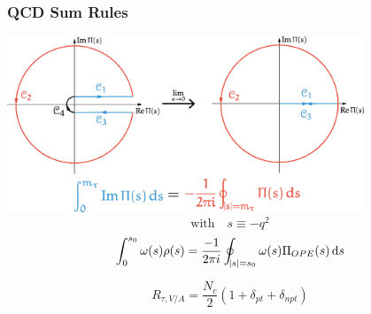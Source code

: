 \documentclass[fleqn]{beamer}
\begin{document}
\begin{frame}
  \frametitle{QCD Sum Rules}

  \vspace{0.2cm}
  
  \centering
  \includegraphics[width=0.8\textwidth]{./images/rTauCauchysTheorem.eps}
  \small
  \begin{equation*}
    \text{with} \quad s \equiv -q^2
  \end{equation*}
  \pause
  \makebox[\linewidth]{\rule{\textwidth}{0.5pt}}
  \normalsize
  \begin{equation}
    \int_0^{s_0} \omega(s) \rho(s) = \frac{-1}{2 \pi i} \oint_{\abs{s}=s_0} \omega(s) \Pi_{OPE}(s) \dif s
  \end{equation}
\end{frame}
\begin{frame}
  \begin{equation}
    R_{\tau,V/A} = \frac{N_c}{2} \left( 1 + \delta_{pt} + \delta_{npt} \right)
  \end{equation}
\end{frame}
\end{document}
